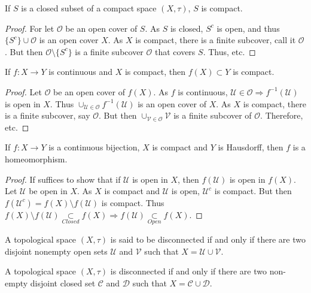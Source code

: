 \documentclass[crop=false,class=book]{standalone}
\begin{document}
\begin{theorem}
If $S$ is a closed subset of a compact space $(X,\tau)$, $S$ is compact.
\end{theorem}
\begin{proof}
For let $\mathcal{O}$ be an open cover of $S$. As $S$ is closed, $S^c$ is open, and thus $\{S^c\} \cup \mathcal{O}$ is an open cover $X$. As $X$ is compact, there is a finite subcover, call it $\mathscr{O}$. But then $\mathscr{O}\setminus \{S^c\}$ is a finite subcover $\mathcal{O}$ that covers $S$. Thus, etc.
\end{proof}
\begin{theorem}
If $f:X\rightarrow Y$ is continuous and $X$ is compact, then $f(X)\subset Y$ is compact.
\end{theorem}
\begin{proof}
Let $\mathcal{O}$ be an open cover of $f(X)$. As $f$ is continuous, $\mathcal{U}\in\mathcal{O}\Rightarrow f^{-1}(\mathcal{U})$ is open in $X$. Thus $\cup_{\mathcal{U}\in \mathcal{O}} f^{-1}(\mathcal{U})$ is an open cover of $X$. As $X$ is compact, there is a finite subcover, say $\mathscr{O}$. But then $\cup_{\mathcal{V}\in \mathscr{O}} \mathcal{V}$ is a finite subcover of $\mathcal{O}$. Therefore, etc.
\end{proof}
\begin{theorem}
If $f:X\rightarrow Y$ is a continuous bijection, $X$ is compact and $Y$ is Hausdorff, then $f$ is a homeomorphism.
\end{theorem}
\begin{proof}
If suffices to show that if $\mathcal{U}$ is open in $X$, then $f(\mathcal{U})$ is open in $f(X)$. Let $\mathcal{U}$ be open in $X$. As $X$ is compact and $\mathcal{U}$ is open, $\mathcal{U}^c$ is compact. But then $f(\mathcal{U}^c) = f(X)\setminus f(\mathcal{U})$ is compact. Thus $f(X)\setminus f(\mathcal{U})\underset{Closed}\subset f(X)\Rightarrow f(\mathcal{U})\underset{Open}\subset f(X)$.
\end{proof}
\begin{definition}
A topological space $(X,\tau)$ is said to be disconnected if and only if there are two disjoint nonempty open sets $\mathcal{U}$ and $\mathcal{V}$ such that $X = \mathcal{U}\cup \mathcal{V}$.
\end{definition}
\begin{theorem}
A topological space $(X,\tau)$ is disconnected if and only if there are two non-empty disjoint closed set $\mathcal{C}$ and $\mathcal{D}$ such that $X=\mathcal{C}\cup\mathcal{D}$.
\end{theorem}
\end{document}
